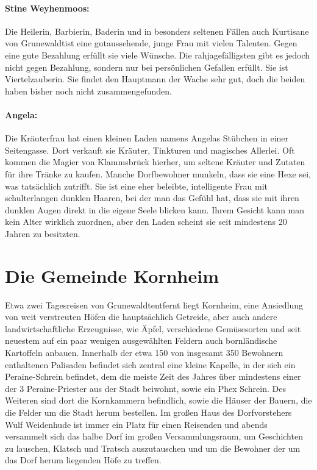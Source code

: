 \paragraph{Stine Weyhenmoos:} Die Heilerin, Barbierin, Baderin und in besonders seltenen Fällen auch Kurtisane von Grunewaldtist eine gutaussehende, junge Frau mit vielen Talenten. Gegen eine gute Bezahlung erfüllt sie viele Wünsche. Die rahjagefälligsten gibt es jedoch nicht gegen Bezahlung, sondern nur bei persönlichen Gefallen erfüllt. Sie ist Viertelzauberin. Sie findet den Hauptmann der Wache sehr gut, doch die beiden haben bisher noch nicht zusammengefunden.

\paragraph{Angela:} Die Kräuterfrau hat einen kleinen Laden namens Angelas Stübchen in einer Seitengasse. Dort verkauft sie Kräuter, Tinkturen und magisches Allerlei. Oft kommen die Magier von Klammsbrück hierher, um seltene Kräuter und Zutaten für ihre Tränke zu kaufen. Manche Dorfbewohner munkeln, dass sie eine Hexe sei, was tatsächlich zutrifft. Sie ist eine eher beleibte, intelligente Frau mit schulterlangen dunklen Haaren, bei der man das Gefühl hat, dass sie mit ihren dunklen Augen direkt in die eigene Seele blicken kann. Ihrem Gesicht kann man kein Alter wirklich zuordnen, aber den Laden scheint sie seit mindestens 20 Jahren zu besitzten.

\section{Die Gemeinde Kornheim}

Etwa zwei Tagesreisen von Grunewaldtentfernt liegt Kornheim, eine Ansiedlung von weit verstreuten Höfen die hauptsächlich Getreide, aber auch andere landwirtschaftliche Erzeugnisse, wie Äpfel, verschiedene Gemüsesorten und seit neuestem auf ein paar wenigen ausgewählten Feldern auch bornländische Kartoffeln anbauen. Innerhalb der etwa 150 von insgesamt 350 Bewohnern enthaltenen Palisaden befindet sich zentral eine kleine Kapelle, in der sich ein Peraine-Schrein befindet, dem die meiste Zeit des Jahres über mindestens einer der 3 Peraine-Priester aus der Stadt beiwohnt, sowie ein Phex Schrein. Des Weiteren sind dort die Kornkammern befindlich, sowie die Häuser der Bauern, die die Felder um die Stadt herum bestellen. Im großen Haus des Dorfvorstehers Wulf Weidenhude ist immer ein Platz für einen Reisenden und abends versammelt sich das halbe Dorf im großen Versammlungsraum, um Geschichten zu lauschen, Klatsch und Tratsch auszutauschen und um die Bewohner der um das Dorf herum liegenden Höfe zu treffen.

